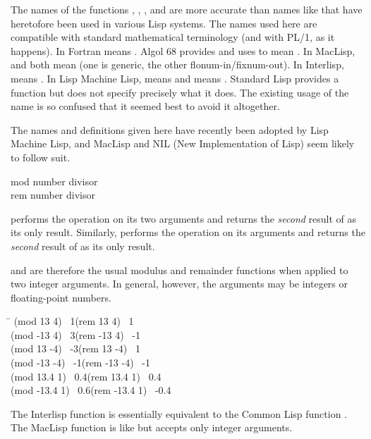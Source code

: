 \begin{defun}[Function]
\beforenoterule
\begin{incompatibility}
The names of the functions , ,
, and  are more accurate than names like 
that have heretofore been used in various Lisp systems.
The names used here are compatible with standard mathematical
terminology (and with PL/1, as it happens).  In Fortran
 means .  Algol 68 provides 
and uses  to mean .
In MacLisp,  and  both
mean  (one is generic, the other flonum-in/fixnum-out).
In Interlisp,  means .
In Lisp Machine Lisp,  means  and  means .
Standard Lisp provides a  function but does not
specify precisely what it does.  The existing usage
of the name  is so confused that it seemed best to avoid it
altogether.

The names and definitions given here have recently been adopted
by Lisp Machine Lisp, and MacLisp and NIL (New Implementation of Lisp) seem likely to follow suit.
\end{incompatibility}
\afternoterule
\end{defun}

\begin{defun}[Function]
mod number divisor \\
rem number divisor

 performs the operation  on its two arguments
and returns the \emph{second} result of  as its only result.
Similarly,
 performs the operation  on its arguments
and returns the \emph{second} result of  as its only result.

 and  are therefore the usual modulus
and remainder functions when applied to two integer arguments.
In general, however, the arguments may be integers or floating-point
numbers.
\begin{lisp}
\textwidth\=\kill
(mod 13 4) \EV\ 1\>(rem 13 4) \EV\ 1 \\
(mod -13 4) \EV\ 3\>(rem -13 4) \EV\ -1 \\
(mod 13 -4) \EV\ -3\>(rem 13 -4) \EV\ 1 \\
(mod -13 -4) \EV\ -1\>(rem -13 -4) \EV\ -1 \\
(mod 13.4 1) \EV\ 0.4\>(rem 13.4 1) \EV\ 0.4 \\
(mod -13.4 1) \EV\ 0.6\>(rem -13.4 1) \EV\ -0.4
\end{lisp}

\beforenoterule
\begin{incompatibility}
The Interlisp function  is essentially
equivalent to the Common Lisp function .  The MacLisp function 
is like  but accepts only integer arguments.
\end{incompatibility}
\afternoterule
\end{defun}

